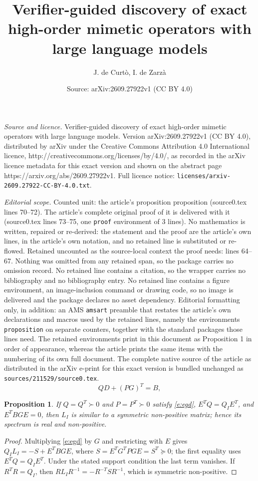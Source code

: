 \documentclass[10pt,a4paper]{amsart}
\title{Verifier-guided discovery of exact high-order mimetic operators with large language models}
\author{J. de Curt\`o, I. de Zarz\`a}
\date{Source: arXiv:2609.27922v1 (CC BY 4.0)}
\newtheorem{proposition}{Proposition}
\begin{document}
\maketitle

\noindent\emph{Source and licence.} Verifier-guided discovery of exact high-order mimetic operators with large language models. Version arXiv:2609.27922v1 (CC BY 4.0), distributed by arXiv under the Creative Commons Attribution 4.0 International licence, http://creativecommons.org/licenses/by/4.0/, as recorded in the arXiv licence metadata for this exact version and shown on the abstract page https://arxiv.org/abs/2609.27922v1. Full licence notice: \texttt{licenses/arxiv-2609.27922-CC-BY-4.0.txt}.\par\smallskip

\noindent\textit{Editorial scope.} Counted unit: the article's proposition proposition (source0.tex lines 70--72). The article's complete original proof of it is delivered with it (source0.tex lines 73--75, one \texttt{proof} environment of 3 lines). No mathematics is written, repaired or re-derived: the statement and the proof are the article's own lines, in the article's own notation, and no retained line is substituted or re-flowed.  Retained uncounted as the source-local context the proof needs: lines 64--67.  Nothing was omitted from any retained span, so the package carries no omission record.  No retained line contains a citation, so the wrapper carries no bibliography and no bibliography entry.  No retained line contains a figure environment, an image-inclusion command or drawing code, so no image is delivered and the package declares no asset dependency.  Editorial formatting only, in addition: an AMS \texttt{amsart} preamble that restates the article's own declarations and macros used by the retained lines, namely the environments \texttt{proposition} on separate counters, together with the standard packages those lines need.  The retained environments print in this document as Proposition 1 in order of appearance, whereas the article prints the same items with the numbering of its own full document.  The complete native source of the article as distributed in the arXiv e-print for this exact version is bundled unchanged as \texttt{sources/211529/source0.tex}.
\begin{equation}
QD+(PG)^T=B,
\label{e:egd}
\end{equation}

\begin{proposition}
If $Q=Q^T\succ0$ and $P=P^T\succ0$ satisfy \eqref{e:egd}, $E^TQ=Q_IE^T$, and $E^TBGE=0$, then $L_I$ is similar to a symmetric non-positive matrix; hence its spectrum is real and non-positive.
\end{proposition}

\begin{proof}
Multiplying \eqref{e:egd} by $G$ and restricting with $E$ gives $Q_I L_I=-S+E^TBGE$, where $S=E^TG^TPGE=S^T\succeq0$; the first equality uses $E^TQ=Q_IE^T$. Under the stated support condition the last term vanishes. If $R^TR=Q_I$, then $R L_I R^{-1}=-R^{-T}SR^{-1}$, which is symmetric non-positive.
\end{proof}
\end{document}
